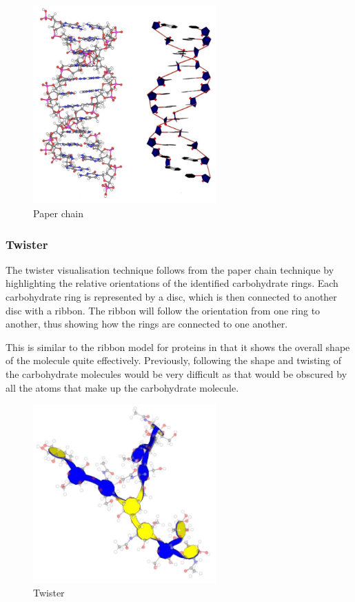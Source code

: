 \begin{figure}[h!]
  \begin{center}
    \includegraphics[width=70mm]{paper_chain}
  \end{center}
  \caption{Paper chain}
  \label{fig:paperchain}
\end{figure}


\subsubsection*{Twister}
\label{ssub:twister}

The twister visualisation technique \citep{kuttel06} follows from the paper
chain technique by highlighting the relative orientations of the identified
carbohydrate rings. Each carbohydrate ring is represented by a disc, which is
then connected to another disc with a ribbon. The ribbon will follow the
orientation from one ring to another, thus showing how the rings are connected
to one another.

This is similar to the ribbon model for proteins in that it shows the overall
shape of the molecule quite effectively. Previously, following the shape and
twisting of the carbohydrate molecules would be very difficult as that would be
obscured by all the atoms that make up the carbohydrate molecule.

\begin{figure}[h!]
  \begin{center}
    \includegraphics[width=70mm]{twister}
  \end{center}
  \caption{Twister}
  \label{fig:twister}
\end{figure}

